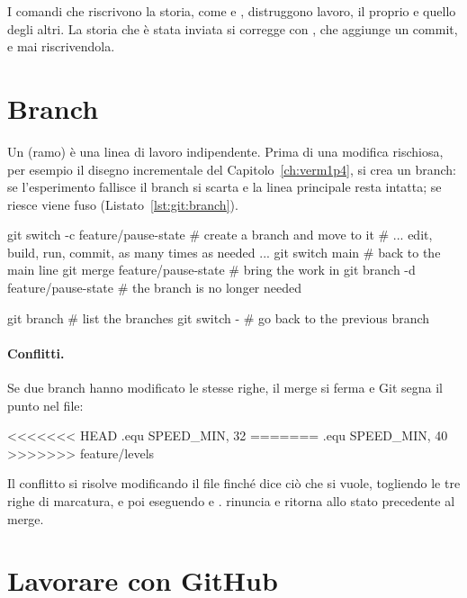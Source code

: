\begin{prgwarn}
I comandi che riscrivono la storia, come  e
, distruggono lavoro, il proprio e quello degli altri.
La storia che è stata inviata si corregge con , che aggiunge
un commit, e mai riscrivendola.
\end{prgwarn}

\section{Branch}

Un  (ramo) è una linea di lavoro indipendente. Prima di una
modifica rischiosa, per esempio il disegno incrementale del
Capitolo~\ref{ch:verm1p4}, si crea un branch: se l'esperimento fallisce il
branch si scarta e la linea principale resta intatta; se riesce viene fuso
(Listato~\ref{lst:git:branch}).

\begin{shell}[caption={Lavorare su un branch.},label=lst:git:branch]
git switch -c feature/pause-state   # create a branch and move to it
# ... edit, build, run, commit, as many times as needed ...
git switch main                     # back to the main line
git merge feature/pause-state       # bring the work in
git branch -d feature/pause-state   # the branch is no longer needed

git branch                          # list the branches
git switch -                        # go back to the previous branch
\end{shell}

\paragraph{Conflitti.} Se due branch hanno modificato le stesse righe, il
merge si ferma e Git segna il punto nel file:
\begin{plain}
<<<<<<< HEAD
.equ SPEED_MIN, 32
=======
.equ SPEED_MIN, 40
>>>>>>> feature/levels
\end{plain}
Il conflitto si risolve modificando il file finché dice ciò che si vuole,
togliendo le tre righe di marcatura, e poi eseguendo  e
.  rinuncia e ritorna allo stato
precedente al merge.

\section{Lavorare con GitHub}

